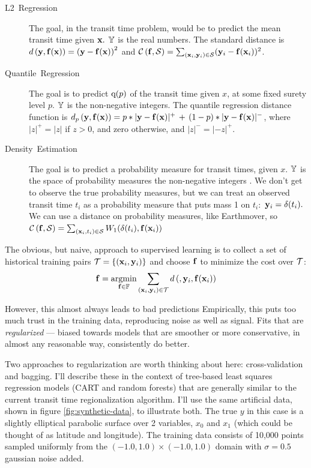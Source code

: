 \documentclass[10pt,openany]{article}
\numberwithin{definition}{section}
\numberwithin{example}{section}
\numberwithin{equation}{section}
\numberwithin{figure}{section}
\begin{document}
\begin{description}
\item [{L2~Regression}] \label{des:L2Regression-The-goal,}The goal, in
the transit time problem, would be to predict the mean transit time
given ${\mathbf x}.$ $\mathbb{Y}$ is the real numbers. The standard distance
is $d\left({\mathbf y},{\mathbf f}({\mathbf x})\right)=\left({\mathbf y}-{\mathbf f}({\mathbf x})\right)^{2}$ and
$\mathcal{C}\left({\mathbf f},\mathcal{S}\right)=\sum_{({\mathbf x}_{i},{\mathbf y}_{i})\in\mathcal{S}}({\mathbf y}_{i}-{\mathbf f}({\mathbf x}_{i}))^{2}$.
\item [{Quantile~Regression}] \label{des:QuantileRegression-The-goal}The
goal is to predict $\text{q}(p)$ of the transit time given $x$,
at some fixed surety level $p.$ $\mathbb{Y}$ is the non-negative integers.
The quantile regression distance function is
$d_{p}\left({\mathbf y},{\mathbf f}({\mathbf x})\right)=p*|{\mathbf y}-{\mathbf f}({\mathbf x})|^{+}\,+\,(1-p)*|{\mathbf y}-{\mathbf f}({\mathbf x})|^{-}$,
where $|z|^{+}=|z|$ if $z>0$, and zero otherwise, and $|z|^{-}=|-z|^{+}.$
\item [{Density~Estimation}] \label{des:DensityEstimation-The-goal}The
goal is to predict a probability measure for transit times, given
$x.$ $\mathbb{Y}$ is the space of probability measures the non-negative
integers . We don't get to observe the true probability measures,
but we can treat an observed transit time $t_{i}$ as a probability
measure that puts mass 1 on $t_{i}:$ ${\mathbf y}_{i}=\delta(t_{i}).$ We
can use a distance on probability measures, like 
Earthmover\cite{levina-bickel-2001,rubner-tomasi-guibas-1998a,rubner-tomasi-guibas-1998b},
so $\mathcal{C}\left({\mathbf f},\mathcal{S}\right)=\sum_{({\mathbf x}_{i},t_{i})\in\mathcal{S}}W_{1}(\delta(t_{i}),{\mathbf f}({\mathbf x}_{i}))$
\end{description}
The obvious, but naive, approach to supervised learning is to collect
a set of historical training pairs $\mathcal{T}=\left\{ ({\mathbf x}_{i},{\mathbf y}_{i})\right\} $
and choose ${\mathbf f}$ to minimize the cost over $\mathcal{T}$: 
\begin{equation}
{\mathbf f}=\operatorname*{argmin}_{{\mathbf f}\in\mathbb{F}}\sum_{({\mathbf x}_{i},{\mathbf y}_{i})\in\mathcal{T}}d\left(,{\mathbf y}_{i},{\mathbf f}({\mathbf x}_{i})\right)
\end{equation}

However, this almost always leads to bad predictions Empirically,
this puts too much trust in the training data, reproducing noise as
well as signal. Fits that are \textit{regularized} --- biased towards
models that are smoother or more conservative, in almost any reasonable
way, consistently do better. 

Two approaches to regularization are worth thinking about here: cross-validation
and bagging. I'll describe these in the context of tree-based least
squares regression models (CART and random forests) that are generally
similar to the current transit time regionalization algorithm. I'll
use the same artificial data, shown in figure \ref{fig:synthetic-data},
to illustrate both. The true $y$ in this case is a slightly elliptical
parabolic surface over 2 variables, $x_{0}$ and $x_{1}$ (which could
be thought of as latitude and longitude). The training data consists
of 10,000 points sampled uniformly from the $(-1.0,1.0)\times(-1.0,1.0)$
domain with $\sigma=0.5$ gaussian noise added. 
\end{document}
